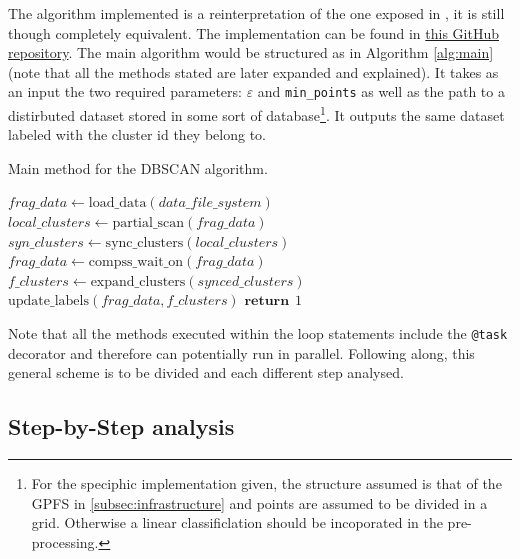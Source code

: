 \documentclass[10pt,journal,compsoc]{IEEEtran}
\let\MYoriglatexcaption\caption
\renewcommand{\caption}[2][\relax]{\MYoriglatexcaption[#2]{#2}}
\begin{document}
The algorithm implemented is a reinterpretation of the one exposed in \cite{ReferencePaper}, it is still though completely equivalent. The implementation can be found in \href{https://github.com/csegarragonz/DBSCAN-pyCOMPSs}{this GitHub repository}. The main algorithm would be structured as in Algorithm \ref{alg:main} (note that all the methods stated are later expanded and explained). It takes as an input the two required parameters: $\varepsilon$ and \texttt{min\_points} as well as the path to a distirbuted dataset stored in some sort of database\footnote{For the speciphic implementation given, the structure assumed is that of the GPFS in \ref{subsec:infrastructure} and points are assumed to be divided in a grid. Otherwise a linear classificlation should be incoporated in the pre-processing.}. It outputs the same dataset labeled with the cluster id they belong to.

\begin{algorithm}
  \caption{Main method for the DBSCAN algorithm. \label{alg:main}}
  \begin{algorithmic}[1]
            \State $frag\_data \gets \text{load\_data}(data\_file\_system)$
            \State $local\_clusters \gets \text{partial\_scan}(frag\_data)$
            \State $syn\_clusters \gets \text{sync\_clusters}(local\_clusters)$
        \EndFor
        \State $frag\_data \gets \text{compss\_wait\_on}(frag\_data)$
            \State $f\_clusters \gets \text{expand\_clusters} (synced\_clusters)$
        \EndFor
        \State $ \text{update\_labels} (frag\_data, f\_clusters)$
        \State $\textbf{return} \hspace{5pt} 1$
    \EndFunction
  \end{algorithmic}
\end{algorithm}

Note that all the methods executed within the loop statements include the \texttt{@task} decorator and therefore can potentially run in parallel. Following along, this general scheme is to be divided and each different step analysed.

\subsection{Step-by-Step analysis} \label{step_by_step}
\end{document}
